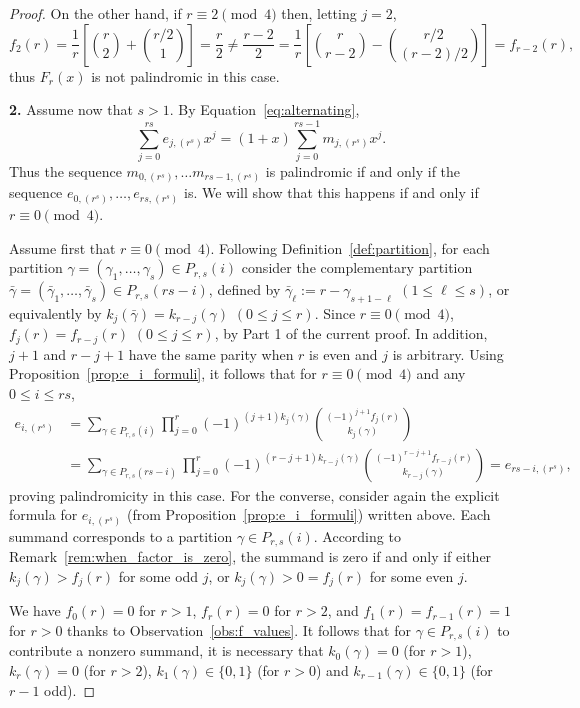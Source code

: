 \documentclass[ALCO,published]{cedram}
\newcommand{\bgamma}{\bar\gamma}
\begin{document}
\begin{proof}
On the other hand, if 
$r\equiv 2 \pmod 4$ then,  
letting $j = 2$,
\[
    f_2(r) 
    = \frac{1}{r} \left[ \binom{r}{2} + \binom{r/2}{1} \right]
    = \frac{r}{2}
    \ne \frac{r-2}{2}
    = \frac{1}{r} \left[ \binom{r}{r-2} - \binom{r/2}{(r-2)/2} \right]
    = f_{r-2}(r),
\]
thus $F_r(x)$ is not palindromic in this case.

{\bf 2.}  
Assume now that $s > 1$.
By Equation~\eqref{eq:alternating}, 
\[
    \sum_{j=0}^{rs} e_{j,(r^s)}x^j
    = (1+x) \sum_{j=0}^{rs-1} m_{j,(r^s)}x^j.
\]
Thus the sequence $m_{0,(r^s)}, \ldots m_{rs-1,(r^s)}$ is palindromic if and only if the sequence $e_{0,(r^s)}, \ldots, e_{rs,(r^s)}$ is.
We will show that this happens if and only if $r \equiv 0 \pmod 4$.

Assume first that $r \equiv 0 \pmod 4$.
Following Definition~\ref{def:partition},
for each partition 
$\gamma  = (\gamma_1, \ldots, \gamma_s) \in P_{r,s}(i)$ 
consider the complementary partition 
$\bgamma = (\bgamma_1, \ldots, \bgamma_s) \in P_{r,s}(rs-i)$, defined by  
$\bgamma_\ell := r-\gamma_{s+1-\ell}$ $(1 \le \ell \le s)$,
or equivalently by
$k_j(\bgamma) = k_{r-j}(\gamma)$ $(0 \le j \le r)$.
Since $r \equiv 0 \pmod 4$,
$f_j(r) = f_{r-j}(r)$ $(0 \le j \le r)$,
by Part 1 of the current proof.
In addition, $j+1$ and $r-j+1$ have the same parity when $r$ is even and $j$ is arbitrary. 
Using Proposition~\ref{prop:e_i_formuli},
it follows that for $r\equiv 0 \pmod 4$ and any $0 \le i \le rs$,
\begin{align*}
    e_{i,(r^s)}
    &= \sum_{\gamma \in P_{r,s}(i)} \prod_{j=0}^{r}
    (-1)^{(j+1)k_j(\gamma)} \binom{(-1)^{j+1} f_j(r)}{k_j(\gamma)} \\
    &= \sum_{\gamma \in P_{r,s}(rs-i)} \prod_{j=0}^{r}
    (-1)^{(r-j+1)k_{r-j}(\gamma)} \binom{(-1)^{r-j+1} f_{r-j}(r)}{k_{r-j}(\gamma)}= e_{rs-i,(r^s)},  
\end{align*}
proving palindromicity in this case. 		
For the converse,
    consider again the explicit formula for $e_{i,(r^s)}$ (from Proposition~\ref{prop:e_i_formuli}) written above. 
    Each summand corresponds to a partition $\gamma \in P_{r,s}(i)$. 
    According to Remark~\ref{rem:when_factor_is_zero}, the summand is zero if and only if either
    $k_j(\gamma) > f_j(r)$ for some odd $j$, or
    $k_j(\gamma) > 0 = f_j(r)$ for some even $j$.
    
       We have
        $f_0(r) = 0$ for $r>1$, 
        $f_r(r) = 0$ for $r>2$, and
        $f_1(r) = f_{r-1}(r) = 1$ for $r>0$ thanks to Observation~\ref{obs:f_values}.
        It follows that for $\gamma \in P_{r,s}(i)$ to contribute a nonzero summand, it is necessary that
        $k_0(\gamma) = 0$ (for $r>1$), 
        $k_r(\gamma) = 0$ (for $r>2$), 
        $k_1(\gamma) \in \{0,1\}$ (for $r>0$) and 
        $k_{r-1}(\gamma) \in \{0,1\}$ (for $r-1$ odd).
        

\end{proof}
\end{document}
